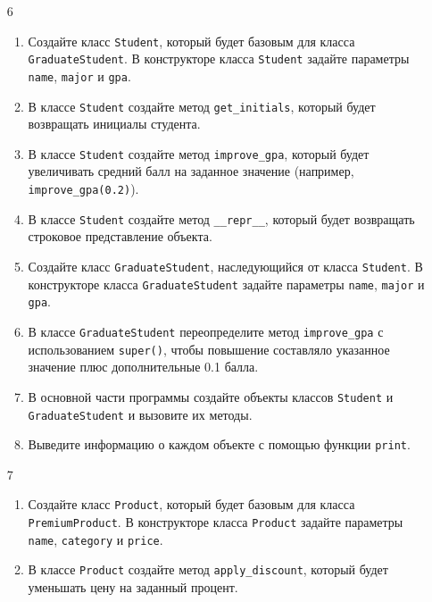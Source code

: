 \begin{enumerate}
\item[6] 
\begin{enumerate}[leftmargin=*]
    \item Создайте класс \texttt{Student}, который будет базовым для класса \texttt{GraduateStudent}. В конструкторе класса \texttt{Student} задайте параметры \texttt{name}, \texttt{major} и \texttt{gpa}.
    
    \item В классе \texttt{Student} создайте метод \texttt{get\_initials}, который будет возвращать инициалы студента.
    
    \item В классе \texttt{Student} создайте метод \texttt{improve\_gpa}, который будет увеличивать средний балл на заданное значение (например, \texttt{improve\_gpa(0.2)}).
    
    \item В классе \texttt{Student} создайте метод \texttt{\_\_repr\_\_}, который будет возвращать строковое представление объекта.
    
    \item Создайте класс \texttt{GraduateStudent}, наследующийся от класса \texttt{Student}. В конструкторе класса \texttt{GraduateStudent} задайте параметры \texttt{name}, \texttt{major} и \texttt{gpa}.
    
    \item В классе \texttt{GraduateStudent} переопределите метод \texttt{improve\_gpa} с использованием \texttt{super()}, чтобы повышение составляло указанное значение плюс дополнительные 0.1 балла.
    
    \item В основной части программы создайте объекты классов \texttt{Student} и \texttt{GraduateStudent} и вызовите их методы.
    
    \item Выведите информацию о каждом объекте с помощью функции \texttt{print}.
\end{enumerate}

\item[7] 
\begin{enumerate}[leftmargin=*]
    \item Создайте класс \texttt{Product}, который будет базовым для класса \texttt{PremiumProduct}. В конструкторе класса \texttt{Product} задайте параметры \texttt{name}, \texttt{category} и \texttt{price}.
    
    \item В классе \texttt{Product} создайте метод \texttt{apply\_discount}, который будет уменьшать цену на заданный процент.
    

\end{enumerate}
\end{enumerate}

